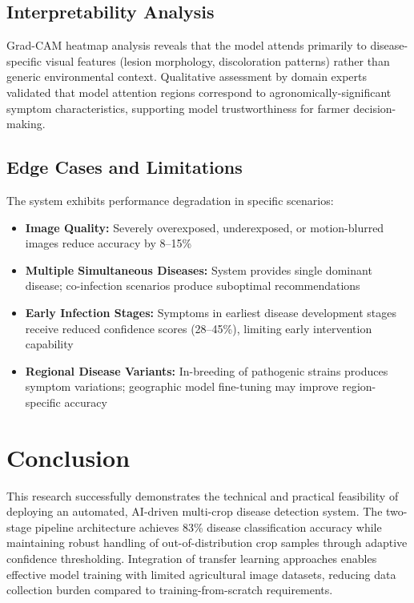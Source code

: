 \documentclass[conference]{IEEEtran}
\begin{document}
\subsection{Interpretability Analysis}

Grad-CAM heatmap analysis reveals that the model attends primarily to disease-specific visual features (lesion morphology, discoloration patterns) rather than generic environmental context. Qualitative assessment by domain experts validated that model attention regions correspond to agronomically-significant symptom characteristics, supporting model trustworthiness for farmer decision-making.

\subsection{Edge Cases and Limitations}

The system exhibits performance degradation in specific scenarios:

\begin{itemize}
\item \textbf{Image Quality:} Severely overexposed, underexposed, or motion-blurred images reduce accuracy by 8--15\%
\item \textbf{Multiple Simultaneous Diseases:} System provides single dominant disease; co-infection scenarios produce suboptimal recommendations
\item \textbf{Early Infection Stages:} Symptoms in earliest disease development stages receive reduced confidence scores (28--45\%), limiting early intervention capability
\item \textbf{Regional Disease Variants:} In-breeding of pathogenic strains produces symptom variations; geographic model fine-tuning may improve region-specific accuracy
\end{itemize}

\section{Conclusion}
\label{sec:conclusion}

This research successfully demonstrates the technical and practical feasibility of deploying an automated, AI-driven multi-crop disease detection system. The two-stage pipeline architecture achieves 83\% disease classification accuracy while maintaining robust handling of out-of-distribution crop samples through adaptive confidence thresholding. Integration of transfer learning approaches enables effective model training with limited agricultural image datasets, reducing data collection burden compared to training-from-scratch requirements.
\end{document}
